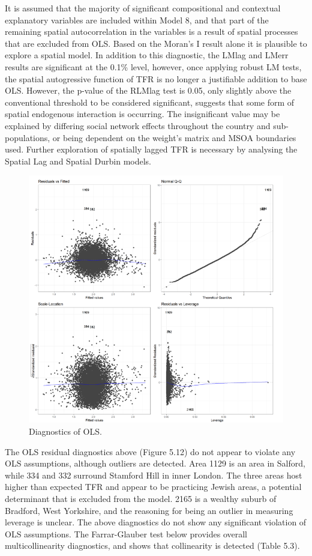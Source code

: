 \documentclass[12pt,twoside]{reedthesis}
\begin{document}
It is assumed that the majority of significant compositional and contextual explanatory variables are included within Model 8, and that part of the remaining spatial autocorrelation in the variables is a result of spatial processes that are excluded from OLS. Based on the Moran's I result alone it is plausible to explore a spatial model. In addition to this diagnostic, the LMlag and LMerr results are significant at the 0.1\% level, however, once applying robust LM tests, the spatial autogressive function of TFR is no longer a justifiable addition to base OLS. However, the p-value of the RLMlag test is 0.05, only slightly above the conventional threshold to be considered significant, suggests that some form of spatial endogenous interaction is occurring. The insignificant value may be explained by differing social network effects throughout the country and sub-populations, or being dependent on the weight's matrix and MSOA boundaries used. Further exploration of spatially lagged TFR is necessary by analysing the Spatial Lag and Spatial Durbin models.
\begin{figure}
\includegraphics[width=0.95\linewidth]{figure/Figure_13} \caption{Diagnostics of OLS.}\label{fig:figure13}
\end{figure}
The OLS residual diagnostics above (Figure 5.12) do not appear to violate any OLS assumptions, although outliers are detected. Area 1129 is an area in Salford, while 334 and 332 surround Stamford Hill in inner London. The three areas host higher than expected TFR and appear to be practicing Jewish areas, a potential determinant that is excluded from the model. 2165 is a wealthy suburb of Bradford, West Yorkshire, and the reasoning for being an outlier in measuring leverage is unclear. The above diagnostics do not show any significant violation of OLS assumptions. The Farrar-Glauber test below provides overall multicollinearity diagnostics, and shows that collinearity is detected (Table 5.3).
\end{document}
